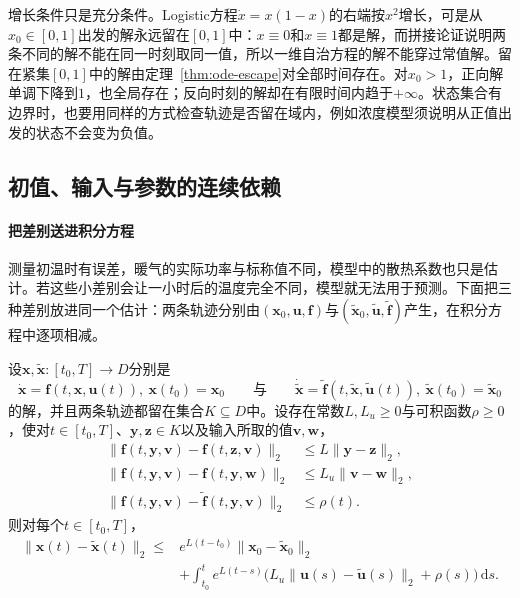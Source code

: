 增长条件只是充分条件。Logistic方程$\dot x=x(1-x)$的右端按$x^2$增长，可是从$x_0\in[0,1]$出发的解永远留在$[0,1]$中：$x\equiv0$和$x\equiv1$都是解，而拼接论证说明两条不同的解不能在同一时刻取同一值，所以一维自治方程的解不能穿过常值解。留在紧集$[0,1]$中的解由定理~\ref{thm:ode-escape}对全部时间存在。对$x_0>1$，正向解单调下降到$1$，也全局存在；反向时刻的解却在有限时间内趋于$+\infty$。状态集合有边界时，也要用同样的方式检查轨迹是否留在域内，例如浓度模型须说明从正值出发的状态不会变为负值。

\subsection{初值、输入与参数的连续依赖}
\label{sec:ode-continuous-dependence}

\paragraph{把差别送进积分方程}
测量初温时有误差，暖气的实际功率与标称值不同，模型中的散热系数也只是估计。若这些小差别会让一小时后的温度完全不同，模型就无法用于预测。下面把三种差别放进同一个估计：两条轨迹分别由$(\bm x_0,\bm u,\bm f)$与$(\widetilde{\bm x}_0,\widetilde{\bm u},\widetilde{\bm f})$产生，在积分方程中逐项相减。

\begin{theorem}[有限时间连续依赖]
  \label{thm:ode-continuous-dependence}
  设$\bm x,\widetilde{\bm x}:[t_0,T]\to D$分别是
  \[
    \dot{\bm x}=\bm f(t,\bm x,\bm u(t)),\ \bm x(t_0)=\bm x_0
    \qquad\text{与}\qquad
    \dot{\widetilde{\bm x}}=\widetilde{\bm f}(t,\widetilde{\bm x},\widetilde{\bm u}(t)),\ \widetilde{\bm x}(t_0)=\widetilde{\bm x}_0
  \]
  的解，并且两条轨迹都留在集合$K\subseteq D$中。设存在常数$L,L_u\geq0$与可积函数$\rho\geq0$，使对$t\in[t_0,T]$、$\bm y,\bm z\in K$以及输入所取的值$\bm v,\bm w$，
  \[
    \begin{aligned}
      \|\bm f(t,\bm y,\bm v)-\bm f(t,\bm z,\bm v)\|_2&\leq L\|\bm y-\bm z\|_2,\\
      \|\bm f(t,\bm y,\bm v)-\bm f(t,\bm y,\bm w)\|_2&\leq L_u\|\bm v-\bm w\|_2,\\
      \|\bm f(t,\bm y,\bm v)-\widetilde{\bm f}(t,\bm y,\bm v)\|_2&\leq\rho(t).
    \end{aligned}
  \]
  则对每个$t\in[t_0,T]$，
  \begin{equation}
    \begin{aligned}
    \|\bm x(t)-\widetilde{\bm x}(t)\|_2
    \leq{}&e^{L(t-t_0)}\|\bm x_0-\widetilde{\bm x}_0\|_2\\
    &+\int_{t_0}^te^{L(t-s)}\bigl(L_u\|\bm u(s)-\widetilde{\bm u}(s)\|_2+\rho(s)\bigr)\,\mathrm ds.
    \end{aligned}
    \label{eq:ode-continuous-dependence}
  \end{equation}
\end{theorem}

